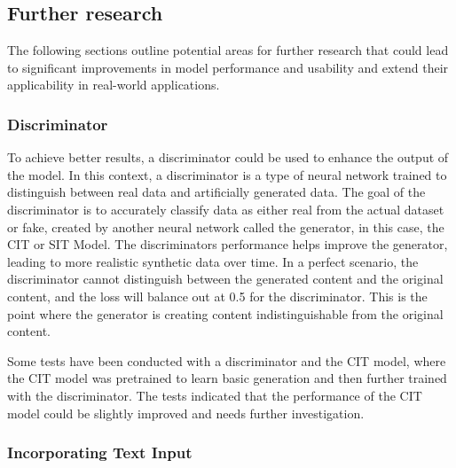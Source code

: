 


\subsection{Further research}

    The following sections outline potential areas for further research that could lead to significant improvements in model performance and usability and extend their applicability in real-world applications.

    \subsubsection{Discriminator}
    To achieve better results, a discriminator could be used to enhance the output of the model. In this context, a discriminator is a type of neural network trained to distinguish between real data and artificially generated data. The goal of the discriminator is to accurately classify data as either real from the actual dataset or fake, created by another neural network called the generator, in this case, the CIT or SIT Model. The discriminators performance helps improve the generator, leading to more realistic synthetic data over time. In a perfect scenario, the discriminator cannot distinguish between the generated content and the original content, and the loss will balance out at 0.5 for the discriminator. This is the point where the generator is creating content indistinguishable from the original content.

    Some tests have been conducted with a discriminator and the CIT model, where the CIT model was pretrained to learn basic generation and then further trained with the discriminator. The tests indicated that the performance of the CIT model could be slightly improved and needs further investigation.

    \subsubsection{Incorporating Text Input}

